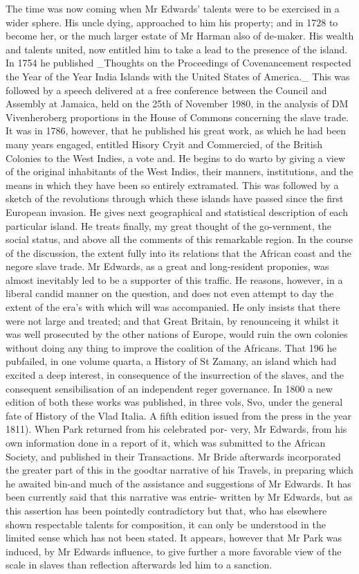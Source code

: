 \documentclass{article}
\begin{document}
The time was now coming when Mr Edwards’ talents were to be exercised in a wider sphere. His uncle dying, approached to him his property; and in 1728 to become her, or the much larger estate of Mr Harman also of de-maker. His wealth and talents united, now entitled him to take a lead to the presence of the island. In 1754 he published \_Thoughts on the Proceedings of Covenancement respected the Year of the Year India Islands with the United States of America.\_ This was followed by a speech delivered at a free conference between the Council and Assembly at Jamaica, held on the 25th of November 1980, in the analysis of DM Vivenheroberg proportions in the House of Commons concerning the slave trade. It was in 1786, however, that he published his great work, as which he had been many years engaged, entitled Hisory Cryit and Commercied, of the British Colonies to the West Indies, a vote and. He begins to do warto by giving a view of the original inhabitants of the West Indies, their manners, institutions, and the means in which they have been so entirely extramated. This was followed by a sketch of the revolutions through which these islands have passed since the first European invasion. He gives next geographical and statistical description of each particular island. He treats finally, my great thought of the go-vernment, the social status, and above all the comments of this remarkable region. In the course of the discussion, the extent fully into its relations that the African coast and the negore slave trade. Mr Edwards, as a great and long-resident proponies, was almost inevitably led to be a supporter of this traffic. He reasons, however, in a liberal candid manner on the question, and does not even attempt to day the extent of the era's with which will was accompanied. He only insists that there were not large and treated; and that Great Britain, by renounceing it whilst it was well prosecuted by the other nations of Europe, would ruin the own colonies without doing any thing to improve the coalition of the Africans. That 196 he pub­failed, in one volume quarta, a History of St Zamany, an island which had excited a deep interest, in consequence of the insurrection of the slaves, and the consequent sensibilisation of an independent reger governance. In 1800 a new edition of both these works was published, in three vols, Svo, under the general fate of History of the Vlad Italia. A fifth edition issued from the press in the year 1811). When Park returned from his celebrated por- very, Mr Edwards, from his own information done in a report of it, which was submitted to the African Society, and published in their Transactions. Mr Bride afterwards incorporated the greater part of this in the goodtar narrative of his Travels, in preparing which he awaited bin-and much of the assistance and suggestions of Mr Edwards. It has been currently said that this narrative was entrie- written by Mr Edwards, but as this assertion has been pointedly contradictory but that, who has elsewhere shown respectable talents for composition, it can only be understood in the limited sense which has not been stated. It appears, however that Mr Park was induced, by Mr Edwards influence, to give further a more favorable view of the scale in slaves than reflection afterwards led him to a sanction.
\end{document}
